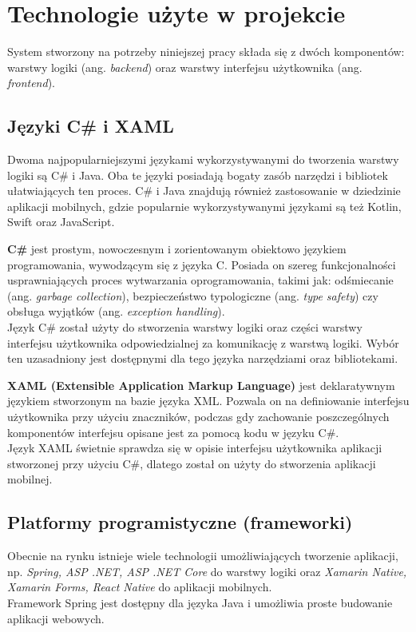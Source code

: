 \chapter{Technologie użyte w projekcie}
System stworzony na potrzeby niniejszej pracy składa się z dwóch komponentów: warstwy logiki (ang. \textit{backend})  oraz warstwy interfejsu użytkownika (ang. \textit{frontend}).
\section{Języki C\# i XAML}
Dwoma najpopularniejszymi językami wykorzystywanymi do tworzenia warstwy logiki są C\# i Java. Oba te języki posiadają bogaty zasób narzędzi i bibliotek ułatwiających ten proces. C\# i Java znajdują również zastosowanie w dziedzinie aplikacji mobilnych, gdzie popularnie wykorzystywanymi językami są też Kotlin, Swift oraz JavaScript.

\textbf{C\#} jest prostym, nowoczesnym i zorientowanym obiektowo językiem programowania, wywodzącym się z języka C. Posiada on szereg funkcjonalności usprawniających proces wytwarzania oprogramowania, takimi jak: odśmiecanie (ang. \textit{garbage collection}), bezpieczeństwo typologiczne (ang. \textit{type safety}) czy obsługa wyjątków (ang. \textit{exception handling}).\cite{wagner_wenzel_latham_onderka_2016}\\
Język C\# został użyty do stworzenia warstwy logiki oraz części warstwy interfejsu użytkownika odpowiedzialnej za komunikację z warstwą logiki. Wybór ten uzasadniony jest dostępnymi dla tego języka narzędziami oraz bibliotekami.

\textbf{XAML (Extensible Application Markup Language)} jest deklaratywnym językiem stworzonym na bazie języka XML. Pozwala on na definiowanie interfejsu użytkownika przy użyciu znaczników, podczas gdy zachowanie poszczególnych komponentów interfejsu opisane jest za pomocą kodu w języku C\#.\cite{britch_dunn_schwelnus_2018} \\
Język XAML świetnie sprawdza się w opisie interfejsu użytkownika aplikacji stworzonej przy użyciu C\#, dlatego został on użyty do stworzenia aplikacji mobilnej.
\section{Platformy programistyczne (frameworki)}
Obecnie na rynku istnieje wiele technologii umożliwiających tworzenie aplikacji, np. \textit{Spring, ASP .NET, ASP .NET Core} do warstwy logiki oraz \textit{Xamarin Native, Xamarin Forms, React Native} do aplikacji mobilnych.\\
Framework Spring jest dostępny dla języka Java i umożliwia proste budowanie aplikacji webowych. 


